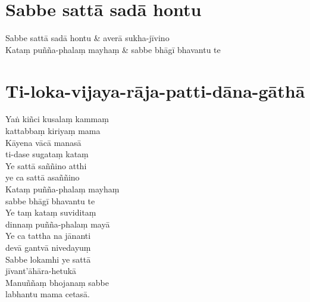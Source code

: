 \section{Sabbe sattā sadā hontu}


\begin{twochants}
Sabbe sattā sadā hontu & averā sukha-jīvino\\
Kataṃ puñña-phalaṃ mayhaṃ & sabbe bhāgī bhavantu te
\end{twochants}


\section{Ti-loka-vijaya-rāja-patti-dāna-gāthā}


Yaṅ kiñci kusalaṃ kammaṃ\\
\vin kattabbaṃ kiriyaṃ mama\\
Kāyena vācā manasā\\
\vin ti-dase sugataṃ kataṃ\\
Ye sattā saññino atthi\\
\vin ye ca sattā asaññino\\
Kataṃ puñña-phalaṃ mayhaṃ\\
\vin sabbe bhāgī bhavantu te\\
Ye taṃ kataṃ suviditaṃ\\
\vin dinnaṃ puñña-phalaṃ mayā\\
Ye ca tattha na jānanti\\
\vin devā gantvā nivedayuṃ\\
Sabbe lokamhi ye sattā\\
\vin jīvant'āhāra-hetukā\\
Manuññaṃ bhojanaṃ sabbe\\
\vin labhantu mama cetasā. 

